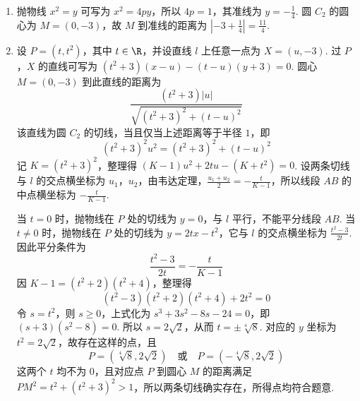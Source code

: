 \begin{solution}
\begin{enumerate}
\item 抛物线 \(x^2=y\) 可写为 \(x^2=4py\)，所以 \(4p=1\)，其准线为 \(y=-\frac14\). 圆 \(C_2\) 的圆心为 \(M=(0,-3)\)，故 \(M\) 到准线的距离为 \(\left|-3+\frac14\right|=\frac{11}{4}\).
\item 设 \(P=(t,t^2)\)，其中 \(t\in\R\)，并设直线 \(l\) 上任意一点为 \(X=(u,-3)\). 过 \(P\)，\(X\) 的直线可写为 \((t^2+3)(x-u)-(t-u)(y+3)=0\). 圆心 \(M=(0,-3)\) 到此直线的距离为
\[
\frac{(t^2+3)|u|}{\sqrt{(t^2+3)^2+(t-u)^2}}
\]
该直线为圆 \(C_2\) 的切线，当且仅当上述距离等于半径 \(1\)，即
\[
(t^2+3)^2u^2=(t^2+3)^2+(t-u)^2
\]
记 \(K=(t^2+3)^2\)，整理得 \((K-1)u^2+2tu-(K+t^2)=0\). 设两条切线与 \(l\) 的交点横坐标为 \(u_1\)，\(u_2\)，由韦达定理，\(\frac{u_1+u_2}{2}=-\frac{t}{K-1}\)，所以线段 \(AB\) 的中点横坐标为 \(-\frac{t}{K-1}\).

当 \(t=0\) 时，抛物线在 \(P\) 处的切线为 \(y=0\)，与 \(l\) 平行，不能平分线段 \(AB\). 当 \(t\neq0\) 时，抛物线在 \(P\) 处的切线为 \(y=2tx-t^2\)，它与 \(l\) 的交点横坐标为 \(\frac{t^2-3}{2t}\). 因此平分条件为
\[
\frac{t^2-3}{2t}=-\frac{t}{K-1}
\]
因 \(K-1=(t^2+2)(t^2+4)\)，整理得
\[
(t^2-3)(t^2+2)(t^2+4)+2t^2=0
\]
令 \(s=t^2\)，则 \(s\geqslant0\)，上式化为 \(s^3+3s^2-8s-24=0\)，即 \((s+3)(s^2-8)=0\). 所以 \(s=2\sqrt2\)，从而 \(t=\pm\sqrt[4]{8}\). 对应的 \(y\) 坐标为 \(t^2=2\sqrt2\)，故存在这样的点，且
\[
P=\left(\sqrt[4]{8},2\sqrt2\right)\quad\text{或}\quad P=\left(-\sqrt[4]{8},2\sqrt2\right)
\]
这两个 \(t\) 均不为 \(0\)，且对应点 \(P\) 到圆心 \(M\) 的距离满足 \(PM^2=t^2+(t^2+3)^2>1\)，所以两条切线确实存在，所得点均符合题意.
\end{enumerate}
\end{solution}
